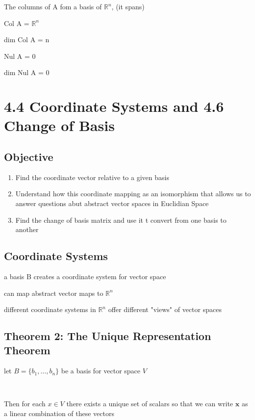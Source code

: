 The columns of A fom a basis of $\mathbb{R}^{n}$, (it spans)

Col A = $\mathbb{R}^{n}$

dim Col A = n

Nul A = {0}

dim Nul A = 0







\section{4.4 Coordinate Systems and 4.6 Change of Basis}

\subsection{Objective}


\begin{enumerate}
	\item Find the coordinate vector relative to a given basis
	\item Understand how this coordinate mapping as an isomorphism that allows us to answer questions abut abstract vector spaces in Euclidian Space
	\item Find the change of basis matrix and use it t convert from one basis to another
	
\end{enumerate}

\subsection{Coordinate Systems}
a basis B creates a coordinate system for vector space

can map abstract vector maps to $\mathbb{R}^{n}$

different coordinate systems in $\mathbb{R}^{n}$ offer different "views" of vector spaces
	

\subsection{Theorem 2: The Unique Representation Theorem}
let $B=\{b_{1},\ldots,b_{n}\}$ be a basis for vector space $V$


\hfill\


Then for each $x\in V$ there exists a unique set of scalars so that we can write $\textbf{x}$ as a linear combination of these vectors

